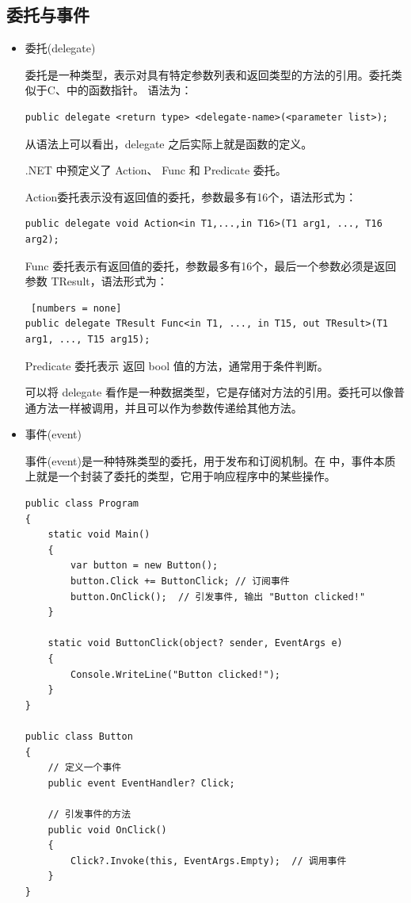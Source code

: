 \subsection{委托与事件}

\begin{itemize}
    \item 委托(delegate)

          委托是一种类型，表示对具有特定参数列表和返回类型的方法的引用。委托类似于C、\cpp 中的函数指针。
          语法为：

          \begin{lstlisting}[numbers = none]
public delegate <return type> <delegate-name>(<parameter list>);
\end{lstlisting}

          从语法上可以看出，delegate 之后实际上就是函数的定义。

          .NET 中预定义了 Action、 Func 和  Predicate 委托。

          Action委托表示没有返回值的委托，参数最多有16个，语法形式为：

          \begin{lstlisting}[numbers = none]
public delegate void Action<in T1,...,in T16>(T1 arg1, ..., T16 arg2);
\end{lstlisting}

          Func 委托表示有返回值的委托，参数最多有16个，最后一个参数必须是返回参数 TResult，语法形式为：

          \begin{lstlisting} [numbers = none]
public delegate TResult Func<in T1, ..., in T15, out TResult>(T1 arg1, ..., T15 arg15);
\end{lstlisting}

          Predicate 委托表示 返回 bool 值的方法，通常用于条件判断。

          可以将 delegate 看作是一种数据类型，它是存储对方法的引用。委托可以像普通方法一样被调用，并且可以作为参数传递给其他方法。


    \item 事件(event)

          事件(event)是一种特殊类型的委托，用于发布和订阅机制。在 \cs 中，事件本质上就是一个封装了委托的类型，它用于响应程序中的某些操作。

          \begin{lstlisting}
public class Program
{
    static void Main()
    {
        var button = new Button();
        button.Click += ButtonClick; // 订阅事件
        button.OnClick();  // 引发事件, 输出 "Button clicked!"
    }

    static void ButtonClick(object? sender, EventArgs e)
    {
        Console.WriteLine("Button clicked!");
    }
}

public class Button
{
    // 定义一个事件
    public event EventHandler? Click;

    // 引发事件的方法
    public void OnClick()
    {
        Click?.Invoke(this, EventArgs.Empty);  // 调用事件 
    }
}
\end{lstlisting}

\end{itemize}

